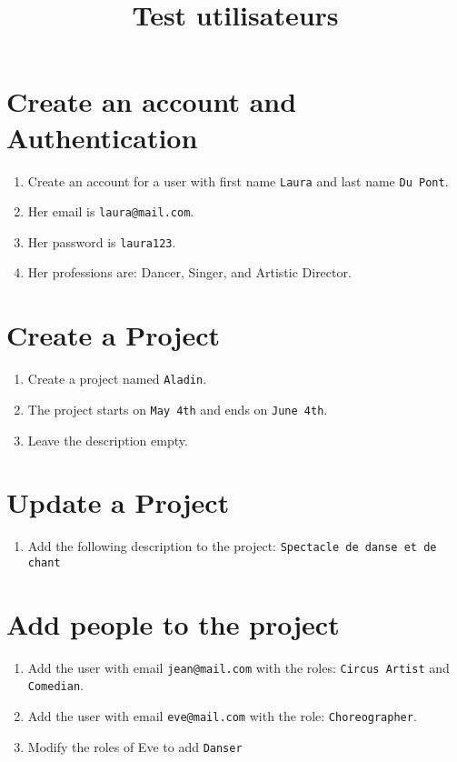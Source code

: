 \documentclass[11pt]{article}
\author{}
\begin{document}
\pagestyle{fancy}
\fancyhead{}


\title{\vspace{-1cm}\huge{Test utilisateurs}\vspace{-1.7cm}}
\date{}
\maketitle
\thispagestyle{fancy}
\section{Create an account and Authentication}
\begin{enumerate}
    \item Create an account for a user with first name \texttt{Laura} and last name \texttt{Du Pont}.
    \item Her email is \texttt{laura@mail.com}.
    \item Her password is \texttt{laura123}.
    \item Her professions are: Dancer, Singer, and Artistic Director.
\end{enumerate}
\section{Create a Project}
\begin{enumerate}
    \item Create a project named \texttt{Aladin}.
    \item The project starts on \texttt{May 4th} and ends on \texttt{June 4th}.
    \item Leave the description empty.
\end{enumerate}
\section{Update a Project}
\begin{enumerate}
    \item Add the following description to the project: \texttt{Spectacle de danse et de chant}
\end{enumerate}
\section{Add people to the project}
\begin{enumerate}
    \item Add the user with email \texttt{jean@mail.com} with the roles: \texttt{Circus Artist} and \texttt{Comedian}.
    \item Add the user with email \texttt{eve@mail.com} with the role: \texttt{Choreographer}.
    \item Modify the roles of Eve to add \texttt{Danser}
\end{enumerate}
\end{document}
